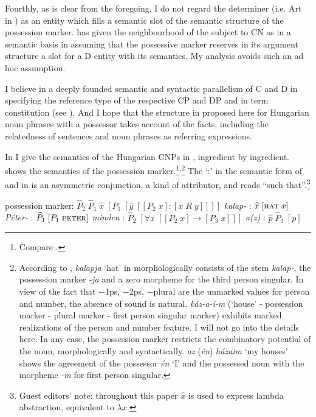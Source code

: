 \documentclass[output=paper,colorlinks,citecolor=brown]{langscibook}
\begin{document}
Fourthly, as is clear from the foregoing, I do not regard the determiner (i.e. Art in ) as an entity which fills a semantic slot of the semantic structure of the possession marker. \citet{Szabolosi87Functional-categories} has given the neighbourhood of the subject to CN as in  a semantic basis in assuming that the possessive marker reserves in its argument structure a slot for a D entity with its semantics. My analysis avoids such an ad hoc assumption.

\largerpage
I believe in a deeply founded semantic and syntactic parallelism of C and D in specifying the reference type of the respective CP and DP and in term constitution (see \citealt{Zimmermann88Wohin-mit-Affixen}). And I hope that the structure in  proposed here for Hungarian noun phrases with a possessor takes account of the facts, including the relatedness of sentences and noun phrases as referring expressions.

\largerpage
In  I give the semantics of the Hungarian CNPs in , ingredient by ingredient.  shows the semantics of the possession marker.\footnote{Compare \citet[184 (32)]{Szabolosi87Functional-categories}.}\textsuperscript{,}\footnote{According to \citet{Melcuk73On-the-possessive-form}, \textit{kalapja} `hat' in  morphologically consists of the stem \textit{kalap-}, the possession marker \textit{-ja} and a zero morpheme for the third person singular. In view of the fact that $-$1ps, $-$2ps, $-$plural are the unmarked values for person and number, the absence of sound is natural. \textit{káz-a-i-m} (`house' - possession marker - plural marker - first person singular marker) exhibits marked realizations of the person and number feature. I will not go into the details here. In any case, the possession marker restricts the combinatory potential of the noun, morphologically and syntactically. \textit{az} (\textit{én}) \textit{házaim} `my houses' shows the agreement of the possessor \textit{én} `I' and the possessed noun with the morpheme \textit{-m} for first person singular.} The ‘:’ in the semantic form of  and in  is an asymmetric conjunction, a kind of attributor, and reads “such that”.\footnote{Guest editors' note: throughout this paper $\widehat{x}$ is used to express lambda abstraction, equivalent to  $\lambda x$.}

\ea \label{ex:zi91:20}
    \ea \label{ex:zi91:20a} possession marker: $\widehat{P}_{2} \; \widehat{P}_{1} \; \widehat{x} \; [{P}_{1} \; [\widehat{y} \; [[P_{2} \; x] : [x \; R \; y]]]]$
    \ex \label{ex:zi91:20b} \textit{kalap-} : $\widehat{x} \; [\textsc{hat} \; x]$
    \ex \label{ex:zi91:20c} \textit{Péter-} : $\widehat{P}_{1} \; [P_{1} \; \textsc{peter}]$
    \ex \label{ex:zi91:20d} \textit{minden} : $\widehat{P}_{2} \; [\forall x \; [[P_{2} \; x] \rightarrow [P_{3} \; x ]]]$
    \ex \label{ex:zi91:20e} \textit{a(z)} : $\widehat{p} \;  \widehat{P}_{3} \; [p]$
    
\end{document}
